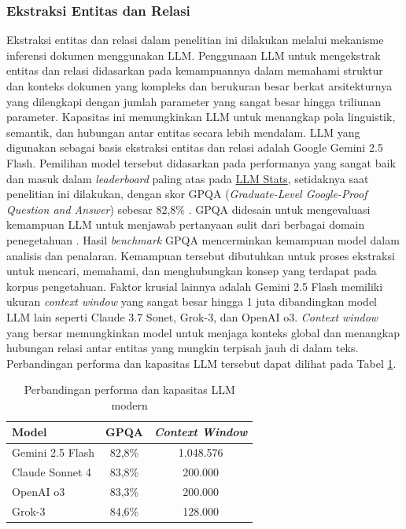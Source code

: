 \subsubsection{Ekstraksi Entitas dan Relasi}
Ekstraksi entitas dan relasi dalam penelitian ini dilakukan melalui mekanisme inferensi dokumen menggunakan LLM.
Penggunaan LLM untuk mengekstrak entitas dan relasi didasarkan pada kemampuannya dalam memahami struktur dan konteks dokumen yang kompleks dan berukuran besar berkat arsitekturnya yang dilengkapi dengan jumlah parameter yang sangat besar hingga triliunan parameter.
Kapasitas ini memungkinkan LLM untuk menangkap pola linguistik, semantik, dan hubungan antar entitas secara lebih mendalam.
LLM yang digunakan sebagai basis ekstraksi entitas dan relasi adalah Google Gemini 2.5 Flash.
Pemilihan model tersebut didasarkan pada performanya yang sangat baik dan masuk dalam \textit{leaderboard} paling atas pada \href{https://llm-stats.com/}{LLM Stats}, setidaknya saat penelitian ini dilakukan, dengan skor GPQA (\textit{Graduate-Level Google-Proof Question and Answer}) sebesar 82,8\% \cite{LLMStats}.
GPQA didesain untuk mengevaluasi kemampuan LLM untuk menjawab pertanyaan sulit dari berbagai domain penegetahuan \cite{rein2024gpqa}.
Hasil \textit{benchmark} GPQA mencerminkan kemampuan model dalam analisis dan penalaran.
Kemampuan tersebut dibutuhkan untuk proses ekstraksi untuk mencari, memahami, dan menghubungkan konsep yang terdapat pada korpus pengetahuan.
Faktor krusial lainnya adalah Gemini 2.5 Flash memiliki ukuran \textit{context window} yang sangat besar hingga 1 juta dibandingkan model LLM lain seperti Claude 3.7 Sonet, Grok-3, dan OpenAI o3.
\textit{Context window} yang bersar memungkinkan model untuk menjaga konteks global dan menangkap hubungan relasi antar entitas yang mungkin terpisah jauh di dalam teks.
Perbandingan performa dan kapasitas LLM tersebut dapat dilihat pada Tabel \ref{tab:llm-comparison}.

\begin{table}[H]
	\centering
	\caption{Perbandingan performa dan kapasitas LLM modern \cite{LLMStats}}
	\label{tab:llm-comparison}
	\begin{tabular}{|l|c|c|}
		\hline
		\textbf{Model}   & \textbf{GPQA} & \textbf{\textit{Context Window}} \\
		\hline \hline
		Gemini 2.5 Flash & 82,8\%        & 1.048.576                        \\
		\hline
		Claude Sonnet 4  & 83,8\%        & 200.000                          \\
		\hline
		OpenAI o3        & 83,3\%        & 200.000                          \\
		\hline
		Grok-3           & 84,6\%        & 128.000                          \\
		\hline
	\end{tabular}
\end{table}

